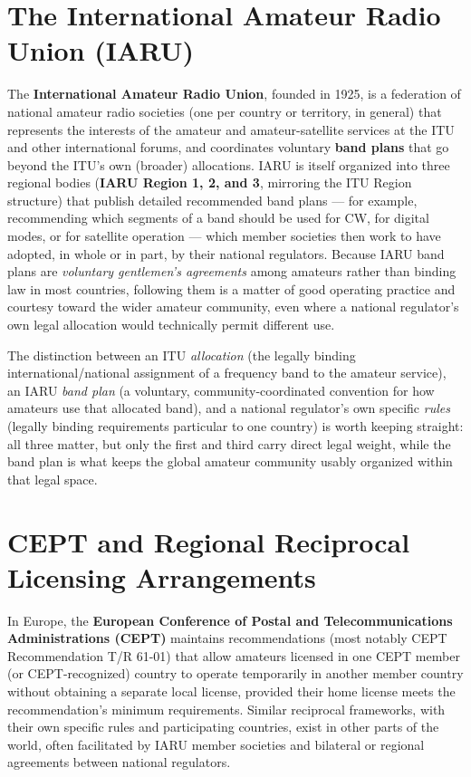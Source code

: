 \section{The International Amateur Radio Union (IARU)}

The \textbf{International Amateur Radio Union}, founded in 1925, is a
federation of national amateur radio societies (one per country or
territory, in general) that represents the interests of the amateur
and amateur-satellite services at the ITU and other international
forums, and coordinates voluntary \textbf{band plans} that go beyond
the ITU's own (broader) allocations. IARU is itself organized into
three regional bodies (\textbf{IARU Region 1, 2, and 3}, mirroring the
ITU Region structure) that publish detailed recommended band plans
--- for example, recommending which segments of a band should be used
for CW, for digital modes, or for satellite operation --- which member
societies then work to have adopted, in whole or in part, by their
national regulators. Because IARU band plans are \emph{voluntary
gentlemen's agreements} among amateurs rather than binding law in most
countries, following them is a matter of good operating practice and
courtesy toward the wider amateur community, even where a national
regulator's own legal allocation would technically permit different
use.

\begin{keyidea}
The distinction between an ITU \emph{allocation} (the legally binding
international/national assignment of a frequency band to the amateur
service), an IARU \emph{band plan} (a voluntary, community-coordinated
convention for how amateurs use that allocated band), and a national
regulator's own specific \emph{rules} (legally binding requirements
particular to one country) is worth keeping straight: all three matter,
but only the first and third carry direct legal weight, while the
band plan is what keeps the global amateur community usably organized
within that legal space.
\end{keyidea}

\section{CEPT and Regional Reciprocal Licensing Arrangements}

In Europe, the \textbf{European Conference of Postal and
Telecommunications Administrations (CEPT)} maintains recommendations
(most notably CEPT Recommendation T/R 61-01) that allow amateurs
licensed in one CEPT member (or CEPT-recognized) country to operate
temporarily in another member country without obtaining a separate
local license, provided their home license meets the recommendation's
minimum requirements. Similar reciprocal frameworks, with their own
specific rules and participating countries, exist in other parts of the
world, often facilitated by IARU member societies and bilateral or
regional agreements between national regulators.

